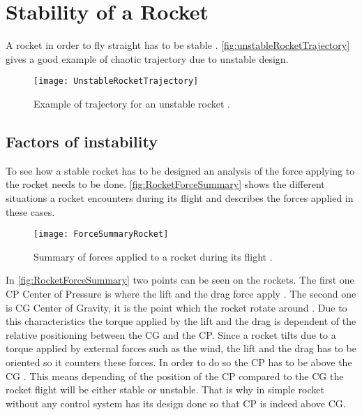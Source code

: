 \section{Stability of a Rocket}
\graphicspath{{figures/"Preanalysis&Requirement"/RocketStability/}}
A rocket in order to fly straight has to be stable \cite{web:rocketnasa}. \autoref{fig:unstableRocketTrajectory} gives a good example of chaotic trajectory due to unstable design.

\begin{figure} [htbp]
	\centering
	\texttt{[image: UnstableRocketTrajectory]}
	\caption{Example of trajectory for an unstable rocket \cite{web:rocketnasa}.}
	\label{fig:unstableRocketTrajectory}
\end{figure}

\subsection{Factors of instability}
To see how a stable rocket has to be designed an analysis of the force applying to the rocket needs to be done. \autoref{fig:RocketForceSummary} shows the different situations a rocket encounters during its flight and describes the forces applied in these cases.

\begin{figure}[htbp]
	\centering
	\texttt{[image: ForceSummaryRocket]}
	\caption{Summary of forces applied to a rocket during its flight \cite{web:rocketnasa}.}
	\label{fig:RocketForceSummary}
\end{figure}

In \autoref{fig:RocketForceSummary} two points can be seen on the rockets. The first one CP Center of Pressure is where the  lift and the drag force apply \cite{web:rocketnasa}. The second one is CG Center of Gravity, it is the point which the rocket rotate around \cite{web:rocketnasa}. Due to this characteristics the torque applied by the lift and the drag is dependent of the relative positioning between the CG and the CP. Since a rocket tilts due to a torque applied by external forces such as the wind, the lift and the drag has to be oriented so it counters these forces. In order to do so the CP has to be above the CG \cite{web:rocketnasa}.
This means depending of the position of the CP compared to the CG the rocket flight will be either stable or unstable. That is why in simple rocket without any control system has its design done so that CP is indeed above CG.


